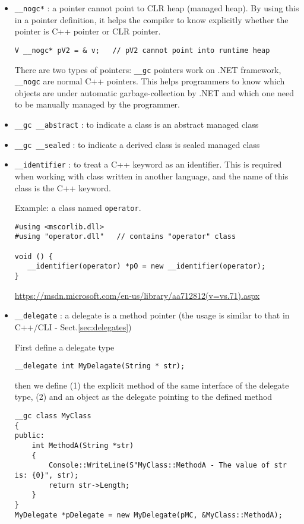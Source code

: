 \begin{itemize}
  \item \verb!__nogc*! : a pointer cannot point to CLR heap (managed heap). By
  using this in a pointer definition, it helps the compiler to know explicitly
  whether the pointer is C++ pointer or CLR pointer.
  
\begin{verbatim}
V __nogc* pV2 = & v;   // pV2 cannot point into runtime heap 
\end{verbatim}

There are two types of pointers: \verb!__gc! pointers work on
.NET framework, \verb!__nogc! are normal C++ pointers. This helps programmers
to know which objects are under automatic garbage-collection by .NET and which
one need to be manually managed by the programmer.
  

  \item \verb!__gc __abstract! : to indicate a class is an abstract managed class
  
  \item \verb!__gc __sealed! : to indicate a derived class is sealed managed class
  
  \item \verb!__identifier! : to treat a C++ keyword as an identifier. This is
   required when working with class written in another language, and
  the name of this class is the C++ keyword.
  
Example: a class named \verb!operator!.
\begin{verbatim}
#using <mscorlib.dll>
#using "operator.dll"   // contains "operator" class

void () {
   __identifier(operator) *pO = new __identifier(operator);
}
\end{verbatim}
\url{https://msdn.microsoft.com/en-us/library/aa712812(v=vs.71).aspx}

  \item \verb!__delegate! : a delegate is a method pointer (the usage is similar to that in C++/CLI - Sect.\ref{sec:delegates})
  
First define a delegate type
\begin{verbatim}
__delegate int MyDelagate(String * str);
\end{verbatim}

then we define (1) the explicit method of the same interface of the delegate type, (2) and an object as the delegate pointing to the defined method
\begin{verbatim}
__gc class MyClass 
{
public:
	int MethodA(String *str) 
	{
		Console::WriteLine(S"MyClass::MethodA - The value of str is: {0}", str);
		return str->Length;
	}
}
MyDelegate *pDelegate = new MyDelegate(pMC, &MyClass::MethodA);



\end{verbatim}
\end{itemize}
